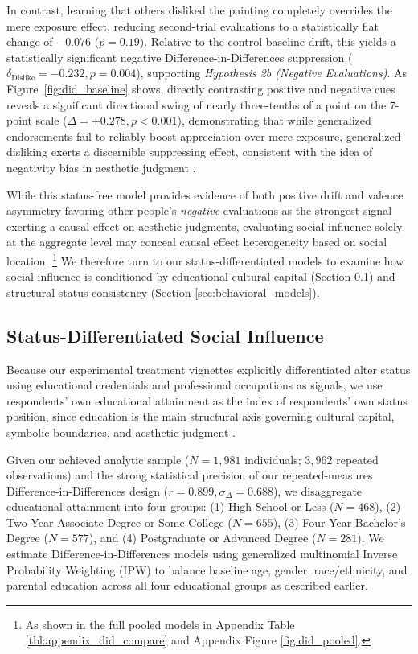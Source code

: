 \documentclass[12pt, letterpaper]{article}
\begin{document}
In contrast, learning that others disliked the painting completely overrides the mere exposure effect, reducing second-trial evaluations to a statistically flat change of $-0.076$ ($p = 0.19$). Relative to the control baseline drift, this yields a statistically significant negative Difference-in-Differences suppression ($\delta_{\text{Dislike}} = -0.232, p = 0.004$), supporting \textit{Hypothesis 2b (Negative Evaluations)}. As Figure~\ref{fig:did_baseline} shows, directly contrasting positive and negative cues reveals a significant directional swing of nearly three-tenths of a point on the 7-point scale ($\Delta = +0.278, p < 0.001$), demonstrating that while generalized endorsements fail to reliably boost appreciation over mere exposure, generalized disliking exerts a discernible suppressing effect, consistent with the idea of negativity bias in aesthetic judgment \citep{rozin2001negativity-01e, baumeister2001bad-19b}.

While this status-free model provides evidence of both positive drift and valence asymmetry favoring other people's \textit{negative} evaluations as the strongest signal exerting a causal effect on aesthetic judgments, evaluating social influence solely at the aggregate level may conceal causal effect heterogeneity based on social location \citep{brand2013causal}.\footnote{As shown in the full pooled models in Appendix Table \ref{tbl:appendix_did_compare} and Appendix Figure \ref{fig:did_pooled}.} We therefore turn to our status-differentiated models to examine how social influence is conditioned by educational cultural capital (Section \ref{sec:edu_models}) and structural status consistency (Section \ref{sec:behavioral_models}).

\subsection{Status-Differentiated Social Influence}
\label{sec:edu_models}
Because our experimental treatment vignettes explicitly differentiated alter status using educational credentials and professional occupations as signals, we use respondents' own educational attainment as the index of respondents' own status position, since education is the main structural axis governing cultural capital, symbolic boundaries, and aesthetic judgment \citep{bennett2009culture-aef}.

Given our achieved analytic sample ($N = 1,981$ individuals; $3,962$ repeated observations) and the strong statistical precision of our repeated-measures Difference-in-Differences design ($r = 0.899, \sigma_{\Delta} = 0.688$), we disaggregate educational attainment into four groups: (1) High School or Less ($N = 468$), (2) Two-Year Associate Degree or Some College ($N = 655$), (3) Four-Year Bachelor's Degree ($N = 577$), and (4) Postgraduate or Advanced Degree ($N = 281$). We estimate Difference-in-Differences models using generalized multinomial Inverse Probability Weighting (IPW) to balance baseline age, gender, race/ethnicity, and parental education across all four educational groups as described earlier. 
\end{document}
